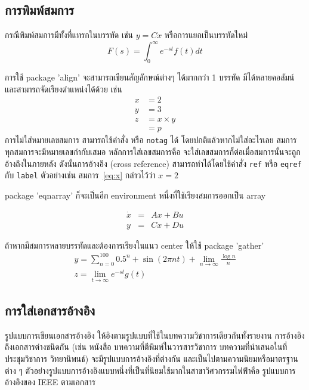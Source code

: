 \documentclass[11pt,a4paper]{article}
\begin{document}
\subsection{การพิมพ์สมการ}
กรณีพิมพ์สมการมีทั้งที่แทรกในบรรทัด เช่น $y=Cx$ หรือการแยกเป็นบรรทัดใหม่
\begin{equation}
	F(s) = \int_0^\infty e^{-st} f(t) dt
\end{equation}

การใช้ package 'align' จะสามารถเขียนสัญลักษณ์ต่างๆ ได้มากกว่า 1 บรรทัด มีได้หลายคอลัมน์ และสามารถจัดเรียงตำแหน่งได้ด้วย เช่น
\begin{align}
    x    &= 2 \label{eq:x} \\
    y    &= 3 \label{eq:y} \\
    z    &= x \times y \nonumber \\
        &= p \label{eq:results}
\end{align}
การไม่ใส่หมายเลขสมการ สามารถใช้คำสั่ง \texttt{\nonumber} หรือ \texttt{notag} ได้ โดยปกติแล้วหากไม่ใส่อะไรเลย สมการทุกสมการจะมีหมายเลขกำกับเสมอ หลักการใส่เลขสมการคือ จะใส่เลขสมการก็ต่อเมื่อสมการนั้นจะถูกอ้างถึงในภายหลัง ดังนั้นการอ้างอึง (cross reference) สามารถทำได้โดยใช้คำสั่ง \texttt{ref} หรือ \texttt{eqref} กับ \texttt{label} ตัวอย่างเช่น สมการ~\eqref{eq:x} กล่าวไว้ว่า $x=2$

package 'eqnarray' ก็จะเป็นอีก environment หนึ่งที่ใช้เรียงสมการออกเป็น array

\begin{eqnarray}
\dot{x} &=& Ax + Bu \\
y &=& Cx+Du
\end{eqnarray}

ถ้าหากมีสมการหลายบรรทัดและต้องการเรียงในแนว center ให้ใช้ package 'gather'
\begin{gather}
y = \sum_{n=0}^100 0.5^n + \sin(2\pi n t) + \lim_{n \rightarrow \infty} \frac{\log n}{n} \\
z = \lim_{t \rightarrow \infty} e^{-st} g(t) 
\end{gather}

\subsection{การใส่เอกสารอ้างอิง}
รูปแบบการเขียนเอกสารอ้างอิง ให้อิงตามรูปแบบที่ใช้ในบทความวิชาการเดียวกันทั้งรายงาน การอ้างอิงถึงเอกสารต่างชนิดกัน (เช่น หนังสือ บทความที่ตีพิมพ์ในวารสารวิชาการ บทความที่นำเสนอในที่ประชุมวิชาการ วิทยานิพนธ์) จะมีรูปแบบการอ้างอิงที่ต่างกัน และเป็นไปตามความนิยมหรือมาตรฐานต่าง ๆ ตัวอย่างรูปแบบการอ้างอิงแบบหนึ่งที่เป็นที่นิยมใช้มากในสาขาวิศวกรรมไฟฟ้าคือ รูปแบบการอ้างอิงของ IEEE ตามเอกสาร
\end{document}
